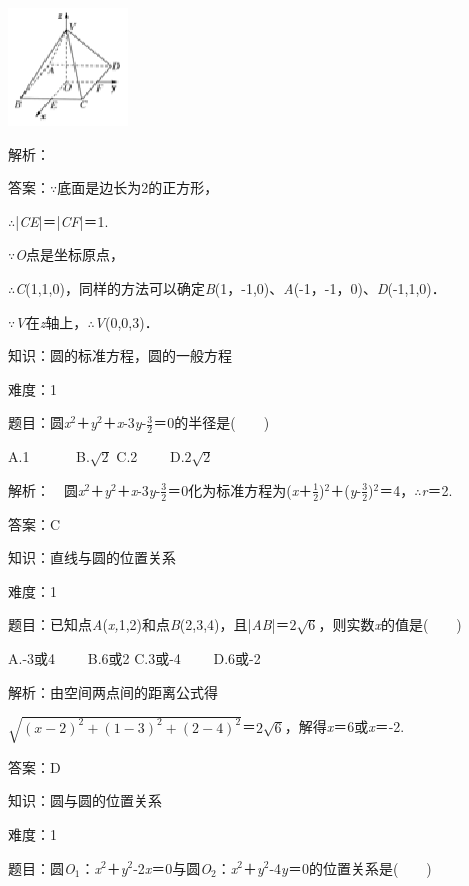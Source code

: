 \documentclass{article} %
\begin{document}
\includegraphics*[width=1.25in, height=1.23in, keepaspectratio=false]{image312}

解析：

答案：$\mathrm{\because}$底面是边长为2的正方形，

$\mathrm{\therefore}$|\textit{CE}|＝|\textit{CF}|＝1.

$\mathrm{\because}$\textit{O}点是坐标原点，

$\mathrm{\therefore}$\textit{C}(1,1,0)，同样的方法可以确定\textit{B}(1，-1,0)、\textit{A}(-1，-1，0)、\textit{D}(-1,1,0)．

$\mathrm{\because}$\textit{V}在\textit{z}轴上，$\mathrm{\therefore}$\textit{V}(0,0,3)．



知识：圆的标准方程，圆的一般方程

难度：1

题目：圆\textit{x}${}^{2}$＋\textit{y}${}^{2}$＋\textit{x}-3\textit{y}-$\frac{3}{2}$＝0的半径是(　　)

A.1　　　 B.$\sqrt{2}$  C.2　　 D.$2\sqrt{2}$

解析：　圆\textit{x}${}^{2}$＋\textit{y}${}^{2}$＋\textit{x}-3\textit{y}-$\frac{3}{2}$＝0化为标准方程为(\textit{x}＋$\frac{1}{2}$)${}^{2}$＋(\textit{y}-$\frac{3}{2}$)${}^{2}$＝4，$\mathrm{\therefore}$\textit{r}＝2.

答案：C

知识：直线与圆的位置关系

难度：1

题目：已知点\textit{A}(\textit{x,}1,2)和点\textit{B}(2,3,4)，且|\textit{AB}|＝$2\sqrt{6}$，则实数\textit{x}的值是(　　)

A.-3或4　　 B.6或2  C.3或-4　　 D.6或-2

解析：由空间两点间的距离公式得

$\sqrt{(x-2)^2+(1-3)^2+(2-4)^2}$＝$2\sqrt{6}$，解得\textit{x}＝6或\textit{x}＝-2.

答案：D

知识：圆与圆的位置关系

难度：1

题目：圆\textit{O}${}_{1}$：\textit{x}${}^{2}$＋\textit{y}${}^{2}$-2\textit{x}＝0与圆\textit{O}${}_{2}$：\textit{x}${}^{2}$＋\textit{y}${}^{2}$-4\textit{y}＝0的位置关系是(　　)
\end{document}

